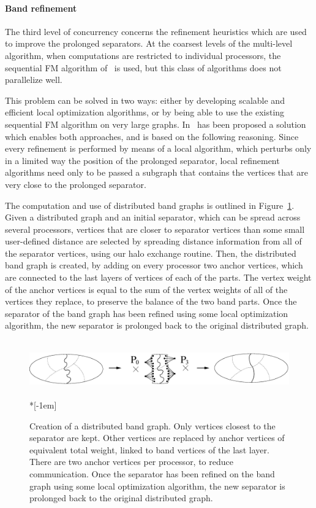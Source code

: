 \paragraph{Band refinement}

The third level of concurrency concerns the refinement heuristics
which are used to improve the prolonged separators. At the coarsest
levels of the multi-level algorithm, when computations are restricted to
individual processors, the sequential FM algorithm of \scotch\ is
used, but this class of algorithms does not parallelize well.

This problem can be solved in two ways: either by developing
scalable and efficient local optimization algorithms, or by being able
to use the existing sequential FM algorithm on very large graphs.
In~\cite{chpe06a} has been proposed a solution
which enables both approaches, and is based on the following
reasoning. Since every refinement is performed by means of a local
algorithm, which perturbs only in a limited way the position of the
prolonged separator, local refinement algorithms need only to be
passed a subgraph that contains the vertices that are very close to
the prolonged separator.

The computation and use of distributed band graphs is outlined in
Figure~\ref{fig-band}. Given a distributed graph and an initial
separator, which can be spread across several processors, vertices
that are closer to separator vertices than some small user-defined
distance are selected by spreading distance information from all of
the separator vertices, using our halo exchange routine. Then, the
distributed band graph is created, by adding on every processor two
anchor vertices, which are connected to the last layers of vertices of
each of the parts. The vertex weight of the anchor vertices is equal
to the sum of the vertex weights of all of the vertices they replace,
to preserve the balance of the two band parts. Once the separator of
the band graph has been refined using some local optimization
algorithm, the new separator is prolonged back to the original
distributed graph.

\begin{figure}
~\hfill%
\includegraphics[scale=0.37]{p_f_band.eps}
\hfill~\\*[-1em]
\caption{Creation of a distributed band graph. Only vertices closest
  to the separator are kept. Other vertices are replaced by anchor
  vertices of equivalent total weight, linked to band vertices of the
  last layer. There are two anchor vertices per processor, to
  reduce communication. Once the separator has been refined on the
  band graph using some local optimization algorithm, the new
  separator is prolonged back to the original distributed graph.}
\label{fig-band}
\end{figure}

